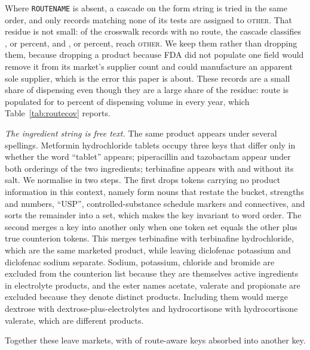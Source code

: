 \documentclass[pdflatex,sn-vancouver-num,Numbered]{sn-jnl}
\begin{document}
Where \texttt{ROUTENAME} is absent, a cascade on the form string is tried in the same order, and
only records matching none of its tests are assigned to \textsc{other}. That residue is not
small: of the \nRouteMissRec crosswalk records with no route, the cascade classifies
\nRouteMissClassified, or \nRouteMissClassPct percent, and \nRouteMissOther, or
\nRouteMissOtherPct percent, reach \textsc{other}. We keep them rather than dropping them,
because dropping a product because FDA did not populate one field would remove it from its
market's supplier count and could manufacture an apparent sole supplier, which is the error this
paper is about. These records are a small share of dispensing even though they are a large share
of the residue: route is populated for \nRouteCovLo to \nRouteCovHi percent of dispensing volume
in every year, which Table~\ref{tab:routecov} reports.

\emph{The ingredient string is free text.} The same product appears under several spellings.
Metformin hydrochloride tablets occupy three keys that differ only in whether the word
``tablet'' appears; piperacillin and tazobactam appear under both orderings of the two
ingredients; terbinafine appears with and without its salt. We normalise in two steps. The first
drops tokens carrying no product information in this context, namely form nouns that restate the
bucket, strengths and numbers, ``USP'', controlled-substance schedule markers and connectives,
and sorts the remainder into a set, which makes the key invariant to word order. The second
merges a key into another only when one token set equals the other plus true counterion tokens.
This merges terbinafine with terbinafine hydrochloride, which are the same marketed product,
while leaving diclofenac potassium and diclofenac sodium separate. Sodium, potassium, chloride
and bromide are excluded from the counterion list because they are themselves active ingredients
in electrolyte products, and the ester names acetate, valerate and propionate are excluded
because they denote distinct products. Including them would merge dextrose with
dextrose-plus-electrolytes and hydrocortisone with hydrocortisone valerate, which are different
products.

Together these leave \nNormKeys markets, with \nKeysAbsorbed of \nRawKeys route-aware keys absorbed into another
key.
\end{document}
